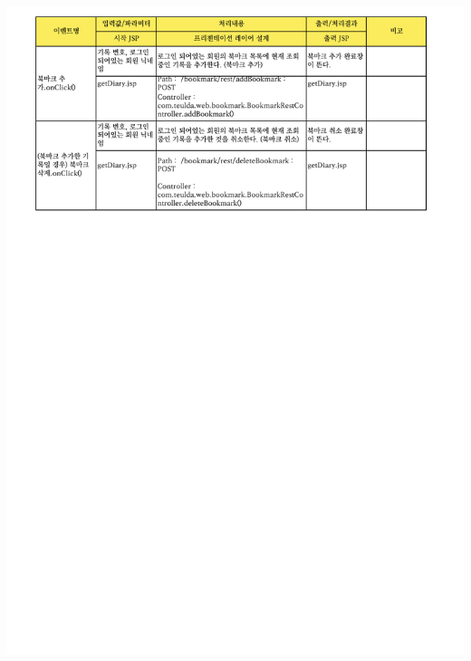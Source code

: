 {{{{{{{{{{{{{{{{{{{{{{{{{{{\includegraphics[width=20cm]{./Figure/Design/Display/diary/diary_09.pdf} \\
}}}}}}}}}}}}}}}}}}}}}}}}}}}

